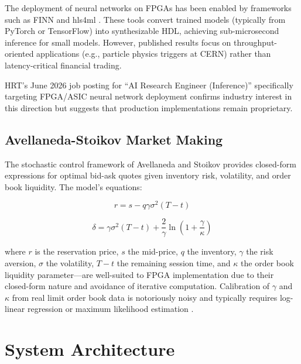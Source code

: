 \documentclass[conference,10pt]{IEEEtran}
\begin{document}
The deployment of neural networks on FPGAs has been enabled by frameworks such as FINN \cite{umuroglu2017} and hls4ml \cite{hls4ml2018}. These tools convert trained models (typically from PyTorch or TensorFlow) into synthesizable HDL, achieving sub-microsecond inference for small models. However, published results focus on throughput-oriented applications (e.g., particle physics triggers at CERN) rather than latency-critical financial trading.

HRT's June 2026 job posting for ``AI Research Engineer (Inference)'' specifically targeting FPGA/ASIC neural network deployment confirms industry interest in this direction but suggests that production implementations remain proprietary.

\subsection{Avellaneda-Stoikov Market Making}

The stochastic control framework of Avellaneda and Stoikov \cite{avellaneda2008} provides closed-form expressions for optimal bid-ask quotes given inventory risk, volatility, and order book liquidity. The model's equations:

\begin{equation}
r = s - q \gamma \sigma^2 (T - t)
\label{eq:reservation}
\end{equation}

\begin{equation}
\delta = \gamma \sigma^2 (T - t) + \frac{2}{\gamma} \ln\!\left(1 + \frac{\gamma}{\kappa}\right)
\label{eq:spread}
\end{equation}

\noindent where $r$ is the reservation price, $s$ the mid-price, $q$ the inventory, $\gamma$ the risk aversion, $\sigma$ the volatility, $T-t$ the remaining session time, and $\kappa$ the order book liquidity parameter---are well-suited to FPGA implementation due to their closed-form nature and avoidance of iterative computation. Calibration of $\gamma$ and $\kappa$ from real limit order book data is notoriously noisy and typically requires log-linear regression or maximum likelihood estimation \cite{avellaneda2008}.

\section{System Architecture}
\label{sec:arch}
\end{document}
